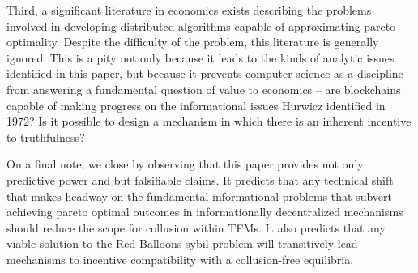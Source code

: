 \documentclass[oneside]{article}   	%
\begin{document}
Third, a significant literature in economics exists describing the problems involved in developing distributed algorithms capable of approximating pareto optimality. Despite the difficulty of the problem, this literature is generally ignored. This is a pity not only because it leads to the kinds of analytic issues identified in this paper, but because it prevents computer science as a discipline from answering a fundamental question of value to economics -- are blockchains capable of making progress on the informational issues Hurwicz identified in 1972? Is it possible to design a mechanism in which there is an inherent incentive to truthfulness?

On a final note, we close by observing that this paper provides not only predictive power and but falsifiable claims. It predicts that any technical shift that makes headway on the fundamental informational problems that subvert achieving pareto optimal outcomes in informationally decentralized mechanisms should reduce the scope for collusion within TFMs. It also predicts that any viable solution to the Red Balloons sybil problem will transitively lead mechanisms to incentive compatibility with a collusion-free equilibria.

\cleardoublepage

\end{document}
